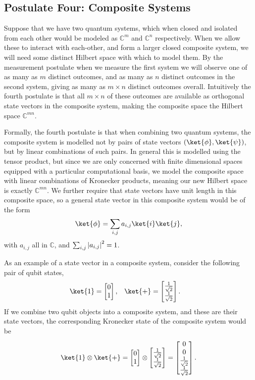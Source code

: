 \subsection{Postulate Four: Composite Systems}
Suppose that we have two quantum systems, which when closed and isolated from each other would be modeled as $\mathbb{C}^m$ and $\mathbb{C}^n$ respectively. When we allow these to interact with each-other, and form a larger closed composite system, we will need some distinct Hilbert space with which to model them. By the measurement postulate when we measure the first system we will observe one of as many as $m$ distinct outcomes, and as many as $n$ distinct outcomes in the second system, giving as many as $m \times n$ distinct outcomes overall. Intuitively the fourth postulate is that all $m \times n$ of these outcomes are available as orthogonal state vectors in the composite system, making the composite space the Hilbert space $\mathbb{C}^{mn}$.

Formally, the fourth postulate is that when combining two quantum systems, the composite system is modelled not by pairs of state vectors $(\ket{\phi}, \ket{\psi})$, but by linear combinations of such pairs. In general this is modelled using the tensor product, but since we are only concerned with finite dimensional spaces equipped with a particular computational basis, we model the composite space with linear combinations of Kronecker products, meaning our new Hilbert space is exactly $\mathbb{C}^{mn}$. We further require that state vectors have unit length in this composite space, so a general state vector in this composite system would be of the form
\[\ket{\phi} = \sum_{i, j} a_{i,j}\ket{i}\ket{j},\]
with $a_{i,j}$ all in $\mathbb{C}$, and $\sum_{i,j} \left| a_{i,j} \right|^2 = 1$.

As an example of a state vector in a composite system, consider the following pair of qubit states,
\begin{align*}
\ket{1} = \left[\begin{matrix}0\\1\end{matrix}\right],
&&&
\ket{+} = \left[\begin{matrix}\frac{1}{\sqrt{2}}\\\frac{1}{\sqrt{2}}\end{matrix}\right].
\end{align*}
If we combine two qubit objects into a composite system, and these are their state vectors, the corresponding Kronecker state of the composite system would be
\[
\ket{1}\otimes \ket{+} = \left[\begin{matrix}0\\1\end{matrix}\right]
\otimes
\left[\begin{matrix}\frac{1}{\sqrt{2}}\\\frac{1}{\sqrt{2}}\end{matrix}\right]
=
\left[\begin{matrix}0\\0\\\frac{1}{\sqrt{2}}\\\frac{1}{\sqrt{2}}\end{matrix}\right].
\]

